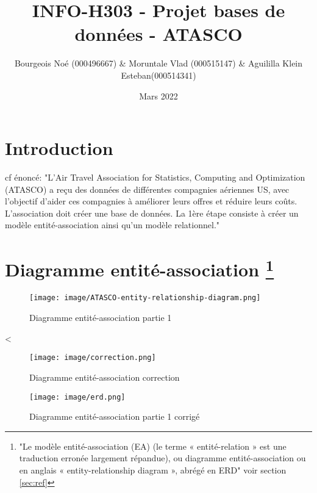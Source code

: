 \documentclass[french, utf8]{article}
\title{INFO-H303 - Projet bases de données - ATASCO}
\author{Bourgeois Noé (000496667) & Moruntale Vlad (000515147) & Aguililla Klein Esteban(000514341) }
\date{Mars 2022}
\begin{document}

\maketitle

\tableofcontents

\newpage

\section{Introduction}
cf énoncé:
"L’Air Travel Association for Statistics, Computing and Optimization (ATASCO) a reçu des données de différentes compagnies aériennes US, avec l’objectif d’aider ces compagnies à améliorer leurs offres et réduire leurs coûts.
L’association doit créer une base de données. La 1ère étape consiste à créer un modèle entité-association ainsi qu’un modèle relationnel."


\section[Diagramme entité-association]{Diagramme entité-association \footnote{"Le modèle entité-association (EA) (le terme « entité-relation » est une traduction erronée largement répandue), ou diagramme entité-association ou en anglais « entity-relationship diagram », abrégé en ERD" voir section \ref{sec:ref}}}

\begin{figure}[h]
    \centering
    \texttt{[image: image/ATASCO-entity-relationship-diagram.png]}
    \caption{Diagramme entité-association partie 1 }
    \label{fig:diag_p1}
\end{figure}

\newpage<


\begin{figure}[h]
    \centering
    \texttt{[image: image/correction.png]}
    \caption{Diagramme entité-association correction}
    \label{fig:diag_correction}
\end{figure}

\newpage


\begin{figure}[h]
    \centering
    \texttt{[image: image/erd.png]}
    \caption{Diagramme entité-association partie 1 corrigé}
    \label{fig:diag_p1_correction}
\end{figure}

\newpage
\end{document}
